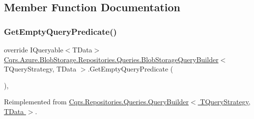 \subsection{Member Function Documentation}
\mbox{\label{classCqrs_1_1Azure_1_1BlobStorage_1_1Repositories_1_1Queries_1_1BlobStorageQueryBuilder_a5987844de032c5473714dafcee7f4ae1_a5987844de032c5473714dafcee7f4ae1}} 
\subsubsection{\texorpdfstring{Get\+Empty\+Query\+Predicate()}{GetEmptyQueryPredicate()}}
{\footnotesize\ttfamily override I\+Queryable$<$T\+Data$>$ \hyperlink{classCqrs_1_1Azure_1_1BlobStorage_1_1Repositories_1_1Queries_1_1BlobStorageQueryBuilder}{Cqrs.\+Azure.\+Blob\+Storage.\+Repositories.\+Queries.\+Blob\+Storage\+Query\+Builder}$<$ T\+Query\+Strategy, T\+Data $>$.Get\+Empty\+Query\+Predicate (\begin{DoxyParamCaption}{ }\end{DoxyParamCaption})\hspace{0.3cm}{\ttfamily [protected]}, {\ttfamily [virtual]}}



Reimplemented from \hyperlink{classCqrs_1_1Repositories_1_1Queries_1_1QueryBuilder_a7dc8f0da3bb4ef54b8cbdda6c50ee0a1_a7dc8f0da3bb4ef54b8cbdda6c50ee0a1}{Cqrs.\+Repositories.\+Queries.\+Query\+Builder$<$ T\+Query\+Strategy, T\+Data $>$}.

